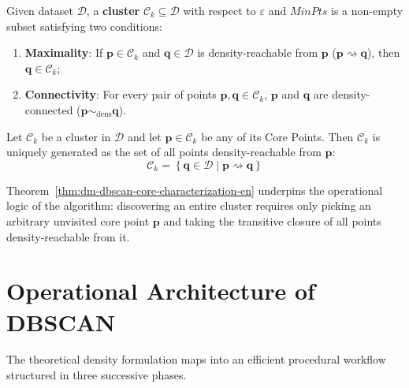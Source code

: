 \begin{definition}
Given dataset $\mathcal{D}$, a \textbf{cluster} $\mathcal{C}_k \subseteq \mathcal{D}$ with respect to $\varepsilon$ and $MinPts$ is a non-empty subset satisfying two conditions:
\begin{enumerate}
    \item \textbf{Maximality}: If $\mathbf{p} \in \mathcal{C}_k$ and $\mathbf{q} \in \mathcal{D}$ is density-reachable from $\mathbf{p}$ ($\mathbf{p} \rightsquigarrow \mathbf{q}$), then $\mathbf{q} \in \mathcal{C}_k$;
    \item \textbf{Connectivity}: For every pair of points $\mathbf{p}, \mathbf{q} \in \mathcal{C}_k$, $\mathbf{p}$ and $\mathbf{q}$ are density-connected ($\mathbf{p} \sim_{\mathrm{dens}} \mathbf{q}$).
\end{enumerate}
\end{definition}

\begin{theorem}
\label{thm:dm-dbscan-core-characterization-en}
Let $\mathcal{C}_k$ be a cluster in $\mathcal{D}$ and let $\mathbf{p} \in \mathcal{C}_k$ be any of its Core Points. Then $\mathcal{C}_k$ is uniquely generated as the set of all points density-reachable from $\mathbf{p}$:
\begin{equation}
    \mathcal{C}_k = \left\{ \mathbf{q} \in \mathcal{D} \;\big|\; \mathbf{p} \rightsquigarrow \mathbf{q} \right\}
\end{equation}
\end{theorem}

Theorem~\ref{thm:dm-dbscan-core-characterization-en} underpins the operational logic of the algorithm: discovering an entire cluster requires only picking an arbitrary unvisited core point $\mathbf{p}$ and taking the transitive closure of all points density-reachable from it.

\section{Operational Architecture of DBSCAN}
\label{sec:dm-dbscan-algorithm}

The theoretical density formulation maps into an efficient procedural workflow structured in three successive phases.

